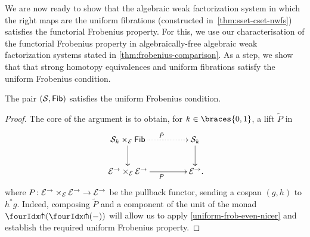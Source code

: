 \documentclass[reqno,10pt,a4paper,oneside,draft]{amsart}
\begin{document}
{{We are now ready to show that the algebraic weak factorization system in which the right maps are the uniform fibrations (constructed in~\cref{thm:sset-cset-nwfs}) satisfies the functorial Frobenius property.
For this, we use our characterisation of the functorial Frobenius property in algebraically-free algebraic weak factorization systems
stated in \cref{thm:frobenius-comparison}. As a step, we show that that  strong homotopy equivalences and uniform fibrations satisfy the uniform Frobenius condition.






\begin{lemma} \label{technical} The pair $(\mathcal{S}, \mathsf{Fib})$ satisfies the uniform Frobenius condition.
\end{lemma}




\begin{proof} The core of the argument is to obtain, for $k \in \braces{0, 1}$, a lift $\tilde{P}$ in 
\begin{equation} \label{strong-h-equiv-uniform-base-change:goal}
\begin{gathered}
\xymatrix@C+2em{
  \cal{S}_k \times_{\cal{E}} \Fib
  \ar@{.>}[r]^{\tilde{P}}
  \ar[d]
&
  \cal{S}_k
  \ar[d]
\\
  \cal{E}^\to \times_{\cal{E}} \cal{E}^\to
  \ar[r]_{P}
&
  \cal{E}^\to
\rlap{.}}
\end{gathered}
\end{equation}
where $P \colon \mathcal{E}^\to \times_{\mathcal{E}} \mathcal{E}^\to \to \mathcal{E}^\to$ be the pullback functor, sending a cospan $(g, h)$ to $h^* g$. Indeed,
composing $\tilde{P}$ and a component of the unit of the monad $\liftl{(\liftr{(-)})}$ will allow us to apply \cref{uniform-frob-even-nicer} and
establish the required uniform Frobenius property. 


\end{proof}}}
\end{document}
